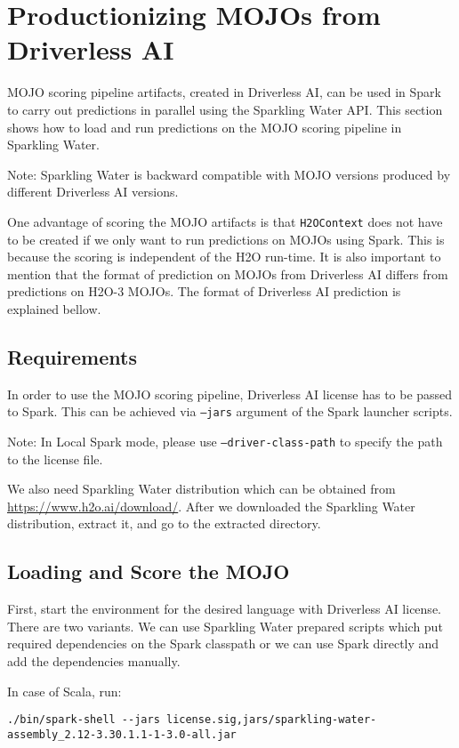 \section{Productionizing MOJOs from Driverless AI}

MOJO scoring pipeline artifacts, created in Driverless AI, can be used in Spark to carry out predictions in parallel
using the Sparkling Water API. This section shows how to load and run predictions on the MOJO scoring pipeline in
Sparkling Water.

Note: Sparkling Water is backward compatible with MOJO versions produced by different Driverless AI versions.

One advantage of scoring the MOJO artifacts is that \texttt{H2OContext} does not have to be created if we only want to
run predictions on MOJOs using Spark. This is because the scoring is independent of the H2O run-time. It is also
important to mention that the format of prediction on MOJOs from Driverless AI differs from predictions on H2O-3 MOJOs.
The format of Driverless AI prediction is explained bellow.

\subsection{Requirements}

In order to use the MOJO scoring pipeline, Driverless AI license has to be passed to Spark.
This can be achieved via \texttt{--jars} argument of the Spark launcher scripts.

Note: In Local Spark mode, please use \texttt{--driver-class-path} to specify the path to the license file.

We also need Sparkling Water distribution which can be obtained from \url{https://www.h2o.ai/download/}.
After we downloaded the Sparkling Water distribution, extract it, and go to the extracted directory.

\subsection{Loading and Score the MOJO}

First, start the environment for the desired language with Driverless AI license. There are two variants. We can use
Sparkling Water prepared scripts which put required dependencies on the Spark classpath or we can use Spark directly
and add the dependencies manually.

In case of Scala, run:
\begin{lstlisting}[style=Bash]
./bin/spark-shell --jars license.sig,jars/sparkling-water-assembly_2.12-3.30.1.1-1-3.0-all.jar
\end{lstlisting}

